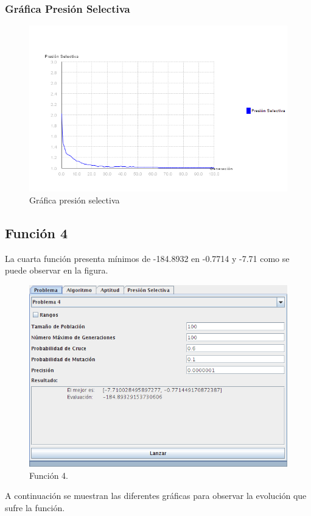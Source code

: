 \documentclass[12pt]{article}
\begin{document}
\subsubsection*{Gráfica Presión Selectiva}
\begin{figure}[H]
\centering
\includegraphics[scale=0.5]{graficas/F3inicial_presion}
\caption{Gráfica presión selectiva}
\label{fig}
\end{figure}
\newpage

\subsection{Función 4}
	La cuarta función presenta mínimos de -184.8932 en -0.7714 y -7.71 como se puede observar en la figura.
\begin{figure}[H]
\centering
\includegraphics[scale=0.5]{graficas/F4inicial}
\caption{Función 4.}
\label{fig}
\end{figure}
	A continuación se muestran las diferentes gráficas para observar la evolución que sufre la función.
\end{document}
